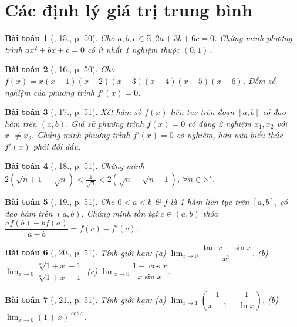 \documentclass{article}
\newtheorem{baitoan}{Bài toán}
\begin{document}

\section{Các định lý giá trị trung bình}

\begin{baitoan}[\cite{TLCT_BT_dai_so_giai_tich_11}, 15., p. 50]
	Cho $a,b,c\in\mathbb{R},2a + 3b + 6c = 0$. Chứng minh phương trình $ax^2 + bx + c = 0$ có ít nhất 1 nghiệm thuộc $(0,1)$.
\end{baitoan}

\begin{baitoan}[\cite{TLCT_BT_dai_so_giai_tich_11}, 16., p. 50]
	Cho $f(x) = x(x - 1)(x - 2)(x - 3)(x - 4)(x - 5)(x - 6)$. Đếm số nghiệm của phương trình $f'(x) = 0$.
\end{baitoan}

\begin{baitoan}[\cite{TLCT_BT_dai_so_giai_tich_11}, 17., p. 51]
	Xét hàm số $f(x)$ liên tục trên đoạn $[a,b]$ có đạo hàm trên $(a,b)$. Giả sử phương trình $f(x) = 0$ có đúng 2 nghiệm $x_1,x_2$ với $x_1\ne x_2$. Chứng minh phương trình $f'(x) = 0$ có nghiệm, hơn nữa biểu thức $f'(x)$ phải đổi dấu.
\end{baitoan}

\begin{baitoan}[\cite{TLCT_BT_dai_so_giai_tich_11}, 18., p. 51]
	Chứng minh $2(\sqrt{n + 1} - \sqrt{n}) < \frac{1}{\sqrt{n}} < 2(\sqrt{n} - \sqrt{n - 1})$, $\forall n\in\mathbb{N}^\star$.
\end{baitoan}

\begin{baitoan}[\cite{TLCT_BT_dai_so_giai_tich_11}, 19., p. 51]
	Cho $0 < a < b$ \& $f$ là 1 hàm liên tục trên $[a,b]$, có đạo hàm trên $(a,b)$. Chứng minh tồn tại $c\in(a,b)$ thỏa $\dfrac{af(b) - bf(a)}{a - b} = f(c) - f'(c)$.
\end{baitoan}

\begin{baitoan}[\cite{TLCT_BT_dai_so_giai_tich_11}, 20., p. 51]
	Tính giới hạn: (a) $\lim_{x\to0} \dfrac{\tan x - \sin x}{x^3}$. (b) $\lim_{x\to0} \dfrac{\sqrt[m]{1 + x} - 1}{\sqrt[n]{1 + x} - 1}$. (c) $\lim_{x\to0} \dfrac{1 - \cos x}{x\sin x}$.
\end{baitoan}

\begin{baitoan}[\cite{TLCT_BT_dai_so_giai_tich_11}, 21., p. 51]
	Tính giới hạn: (a) $\lim_{x\to1} \left(\dfrac{1}{x - 1} - \dfrac{1}{\ln x}\right)$. (b) $\lim_{x\to0} (1 + x)^{\cot x}$.
\end{baitoan}
\end{document}
